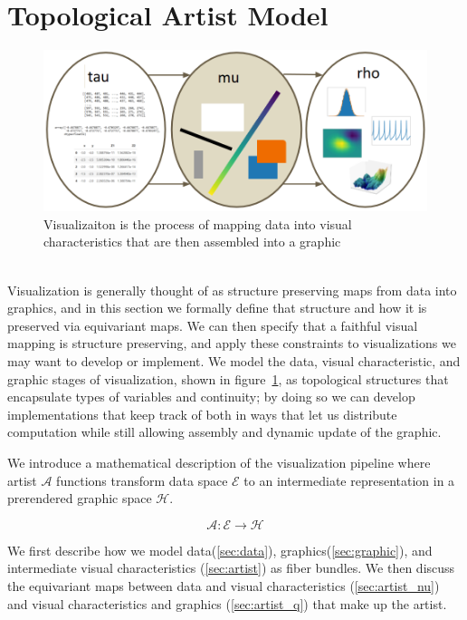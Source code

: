 \documentclass[../main.tex]{subfiles}
\begin{document}
\section{Topological Artist Model}
\label{sec:tam}
\begin{figure}[H]
    \includegraphics[width=\textwidth]{figures/math/dar.png}
    \caption{Visualizaiton is the process of mapping data into visual characteristics that are then assembled into a graphic}
    \label{fig:artist_stages}
\end{figure}

\\
Visualization is generally thought of as structure preserving maps from data into graphics, and in this section we formally define that structure and how it is preserved via equivariant maps. We can then specify that a faithful visual mapping is structure preserving, and apply these constraints to visualizations we may want to develop or implement. We model the data, visual characteristic, and graphic stages of visualization, shown in figure~\ref{fig:artist_stages}, as topological structures that encapsulate types of variables and continuity; by doing so we can develop implementations that keep track of both in ways that let us distribute computation while still allowing assembly and dynamic update of the graphic. 

We introduce a mathematical description of the visualization pipeline where artist $\mathscr{A}$ functions transform data space $\mathscr{E}$ to an intermediate representation in a prerendered graphic space $\mathscr{H}$.

\begin{equation}
    \label{eq:artist}
    \mathscr{A}: \mathscr{E} \rightarrow \mathscr{H}
\end{equation}

We first describe how we model data(\ref{sec:data}), graphics(\ref{sec:graphic}), and intermediate visual characteristics (\ref{sec:artist}) as fiber bundles. We then discuss the equivariant maps between data and visual characteristics (\ref{sec:artist_nu}) and visual characteristics and graphics (\ref{sec:artist_q}) that make up the artist.
\end{document}
